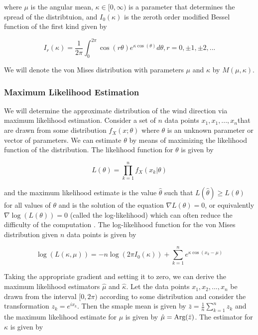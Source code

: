 \documentclass[11pt]{article}
\numberwithin{equation}{section}
\numberwithin{figure}{section}
\begin{document}
where $\mu$ is the angular mean, $\kappa \in [0,\infty)$ is a parameter that determines the spread of the distribtuion, and $I_0(\kappa)$ is the zeroth order modified Bessel function of the first kind given by 

\begin{equation}\label{eq:I0}
I_r(\kappa) = \frac{1}{2\pi} \int_0^{2\pi}\cos( r \theta )e^{\kappa\cos(\theta )} d\theta, r = 0,\pm 1, \pm 2,...
\end{equation}

We will denote the von Mises distribution with parameters $\mu$ and $\kappa$ by $M(\mu, \kappa)$.

\subsubsection{Maximum Likelihood Estimation}

We will determine the approximate distribution of the wind direction via maximum likelihood estimation. Consider a set of $n$ data points $ x_1, x_1, ...,x_n $that are drawn from some distribution $f_X(x;\theta)$ where $\theta$ is an unknown parameter or vector of parameters. We can estimate $\theta$ by means of maximizing the likelihood function of the distribution. The likelihood function for $\theta$ is given by

\begin{equation}\label{eq:likelihood fn}
L(\theta) = \prod_{k=1}^n f_X(x_k|\theta)
\end{equation}

and the maximum likelihood estimate is the value $\hat{\theta}$ such that $L(\hat{\theta}) \ge L(\theta)$ for all values of $\theta$ and is the solution of the equation $\nabla L(\theta) = 0$, or equivalently $\nabla \log(L(\theta)) = 0$ (called the log-likelihood) which can often reduce the difficulty of the computation \cite{Larsen}. The log-likelihood function for the von Mises distribution given $n$ data points is given by 

\begin{equation}\label{eq:vmll}
\log(L(\kappa, \mu)) = -n\log( 2\pi I_0(\kappa))+ \sum_{k=1}^n e^{\kappa \cos(x_k-\mu)}
\end{equation}

Taking the appropriate gradient and setting it to zero, we can derive the maximum likelihood estimators $\hat{\mu}$ and $\hat{\kappa}$. Let the data points $x_1, x_2, ..., x_n$ be drawn from the interval $[0,2\pi)$ according to some distribution and consider the transformation $z_k = e^{i x_k}$. Then the smaple mean is given by $\bar{z} =\frac{1}{n}\sum_{k=1}^n z_k$ and the maximum likelihood estimate for $\mu$ is given by $\hat{\mu} = \textnormal{Arg}(\bar{z})$. The estimator for $\kappa$ is given by \cite{borradaile}
\end{document}
